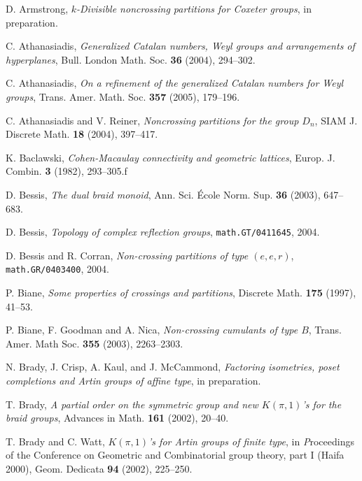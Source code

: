 \documentclass[12pt,letterpaper, reqno]{aimpl}
\begin{document}
\begin{thebibliography}{99}

D. Armstrong, \emph{$k$-Divisible noncrossing partitions for Coxeter groups}, in preparation.

C. Athanasiadis, \emph{Generalized Catalan numbers, Weyl groups and arrangements of hyperplanes}, Bull. London Math. Soc. {\bf 36} (2004), 294--302.

C. Athanasiadis, \emph{On a refinement of the generalized Catalan numbers for Weyl groups}, Trans. Amer. Math. Soc. {\bf 357} (2005), 179--196.

C. Athanasiadis and V. Reiner, \emph{Noncrossing partitions for the group $D_n$}, SIAM J. Discrete Math. {\bf 18} (2004), 397--417.

K. Baclawski, \emph{Cohen-Macaulay connectivity and geometric lattices}, Europ. J. Combin. {\bf 3} (1982), 293--305.f

D. Bessis, \emph{The dual braid monoid}, Ann. Sci. \'Ecole Norm. Sup. {\bf 36} (2003), 647--683.

D. Bessis, \emph{Topology of complex reflection groups}, \texttt{math.GT/0411645}, 2004.

D. Bessis and R. Corran, \emph{Non-crossing partitions of type $(e,e,r)$}, \texttt{math.GR/0403400}, 2004.

P. Biane, \emph{Some properties of crossings and partitions}, Discrete Math. {\bf 175} (1997), 41--53.

P. Biane, F. Goodman and A. Nica, \emph{Non-crossing cumulants of type $B$}, Trans. Amer. Math Soc. {\bf 355} (2003), 2263--2303.

N. Brady, J. Crisp, A. Kaul, and J. McCammond, \emph{Factoring isometries, poset completions and Artin groups of affine type}, in preparation.

T. Brady, \emph{A partial order on the symmetric group and new $K(\pi,1)$'s for the braid groups}, Advances in Math. {\bf 161} (2002), 20--40.

T. Brady and C. Watt, \emph{$K(\pi,1)$'s for Artin groups of finite type}, in {\emph Proceedings of the Conference on Geometric and Combinatorial group theory, part I (Haifa 2000)}, Geom. Dedicata {\bf 94} (2002), 225--250.


\end{thebibliography}
\end{document}

